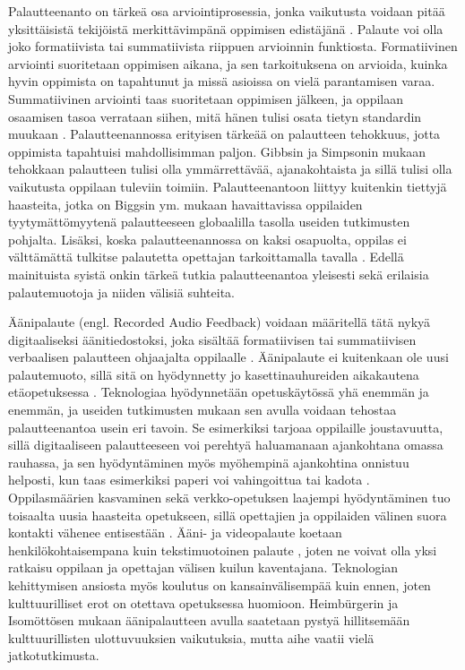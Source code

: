 \documentclass[utf8]{gradu3}
\begin{document}
Palautteenanto on tärkeä osa arviointiprosessia, jonka vaikutusta voidaan pitää yksittäisistä tekijöistä merkittävimpänä oppimisen edistäjänä \parencite[][]{gibbs2004}. Palaute voi olla joko formatiivista tai summatiivista riippuen arvioinnin funktiosta. Formatiivinen arviointi suoritetaan oppimisen aikana, ja sen tarkoituksena on arvioida, kuinka hyvin oppimista on tapahtunut ja missä asioissa on vielä parantamisen varaa. Summatiivinen arviointi taas suoritetaan oppimisen jälkeen, ja oppilaan osaamisen tasoa verrataan siihen, mitä hänen tulisi osata tietyn standardin muukaan \parencite[][]{biggs2011}. Palautteenannossa erityisen tärkeää on palautteen tehokkuus, jotta oppimista tapahtuisi mahdollisimman paljon. Gibbsin ja Simpsonin \parencite[][]{gibbs2004} mukaan tehokkaan palautteen tulisi olla ymmärrettävää, ajanakohtaista ja sillä tulisi olla vaikutusta oppilaan tuleviin toimiin. Palautteenantoon liittyy kuitenkin tiettyjä haasteita, jotka on Biggsin ym. \parencite[][]{biggs2011} mukaan havaittavissa oppilaiden tyytymättömyytenä palautteeseen globaalilla tasolla useiden tutkimusten pohjalta. Lisäksi, koska palautteenannossa on kaksi osapuolta, oppilas ei välttämättä tulkitse palautetta opettajan tarkoittamalla tavalla \parencite[][]{sadler2010}. Edellä mainituista syistä onkin tärkeä tutkia palautteenantoa yleisesti sekä erilaisia palautemuotoja ja niiden välisiä suhteita. 

Äänipalaute (engl. Recorded Audio Feedback) voidaan määritellä tätä nykyä digitaaliseksi äänitiedostoksi, joka sisältää formatiivisen tai summatiivisen verbaalisen palautteen ohjaajalta oppilaalle \parencite[][]{developing}. Äänipalaute ei kuitenkaan ole uusi palautemuoto, sillä sitä on hyödynnetty jo kasettinauhureiden aikakautena etäopetuksessa \parencite[][]{developing}. Teknologiaa hyödynnetään opetuskäytössä yhä enemmän ja enemmän, ja useiden tutkimusten mukaan sen avulla voidaan tehostaa palautteenantoa usein eri tavoin. Se esimerkiksi tarjoaa oppilaille joustavuutta, sillä digitaaliseen palautteeseen voi perehtyä haluamanaan ajankohtana omassa rauhassa, ja sen hyödyntäminen myös myöhempinä ajankohtina onnistuu helposti, kun taas esimerkiksi paperi voi vahingoittua tai kadota \parencite[][]{technology}. Oppilasmäärien kasvaminen sekä verkko-opetuksen laajempi hyödyntäminen tuo toisaalta uusia haasteita opetukseen, sillä opettajien ja oppilaiden välinen suora kontakti vähenee entisestään \parencite[][]{engaging}. Ääni- ja videopalaute koetaan henkilökohtaisempana kuin tekstimuotoinen palaute \parencite[][]{evaluating}, joten ne voivat olla yksi ratkaisu oppilaan ja opettajan välisen kuilun kaventajana. Teknologian kehittymisen ansiosta myös koulutus on kansainvälisempää kuin ennen, joten kulttuurilliset erot on otettava opetuksessa huomioon. Heimbürgerin ja Isomöttösen \parencite[][]{moderating} mukaan äänipalautteen avulla saatetaan pystyä hillitsemään kulttuurillisten ulottuvuuksien vaikutuksia, mutta aihe vaatii vielä jatkotutkimusta.
\end{document}
